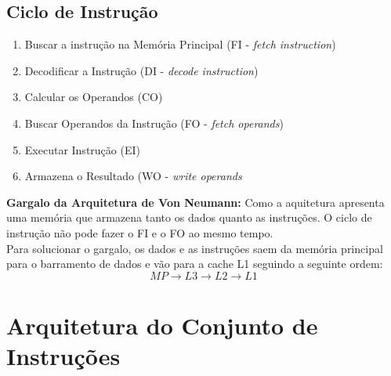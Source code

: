 \documentclass{article}
\begin{document}
		\subsection{Ciclo de Instrução}
			\begin{enumerate}
				\item Buscar a instrução na Memória Principal (FI - \textit{fetch instruction})
				\item Decodificar a Instrução (DI - \textit{decode instruction})
				\item Calcular os Operandos (CO)
				\item Buscar Operandos da Instrução (FO - \textit{fetch operands})
				\item Executar Instrução (EI)
				\item Armazena o Resultado (WO - \textit{write operands}
			\end{enumerate}
		\textbf{Gargalo da Arquitetura de Von Neumann:} Como a aquitetura apresenta uma memória que armazena tanto os dados quanto as instruções. O ciclo de instrução não pode fazer o FI e o FO ao mesmo tempo.\\
		Para solucionar o gargalo, os dados e as instruções saem da memória principal para o barramento de dados e vão para a cache L1 seguindo a seguinte ordem:
		$$MP \to L3 \to L2 \to L1$$
	\section{Arquitetura do Conjunto de Instruções}
		
\end{document}
